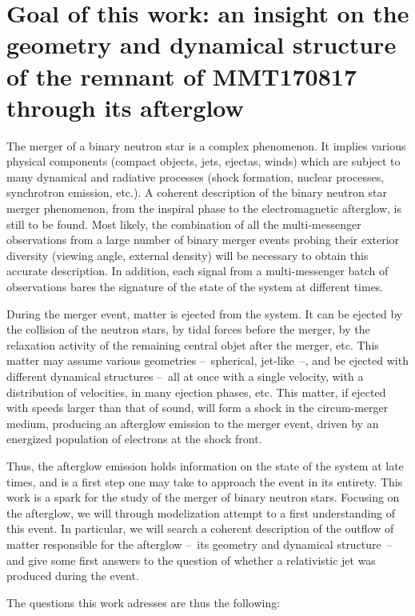 \section{Goal of this work: an insight on the geometry and dynamical structure of the remnant of MMT170817 through its afterglow}

The merger of a binary neutron star is a complex phenomenon. It implies various physical components (compact objects, jets, ejectas, winds) which are subject to many dynamical and radiative processes (shock formation, nuclear processes, synchrotron emission, etc.). A coherent description of the binary neutron star merger phenomenon, from the inspiral phase to the electromagnetic afterglow, is still to be found. Most likely, the combination of all the multi-messenger observations from a large number of binary merger events probing their exterior diversity (viewing angle, external density) will be necessary to obtain this accurate description. In addition, each signal from a multi-messenger batch of observations bares the signature of the state of the system at different times.

During the merger event, matter is ejected from the system. It can be ejected by the collision of the neutron stars, by tidal forces before the merger, by the relaxation activity of the remaining central objet after the merger, etc. This matter may assume various geometries --~spherical, jet-like~--, and be ejected with different dynamical structures --~all at once with a single velocity, with a distribution of velocities, in many ejection phases, etc. This matter, if ejected with speeds larger than that of sound, will form a shock in the circum-merger medium, producing an afterglow emission to the merger event, driven by an energized population of electrons at the shock front.

Thus, the afterglow emission holds information on the state of the system at late times, and is a first step one may take to approach the event in its entirety. This work is a spark for the study of the merger of binary neutron stars. Focusing on the afterglow, we will through modelization attempt to a first understanding of this event. In particular, we will search a coherent description of the outflow of matter responsible for the afterglow --~its geometry and dynamical structure~-- and give some first answers to the question of whether a relativistic jet was produced during the event.

The questions this work adresses are thus the following:

